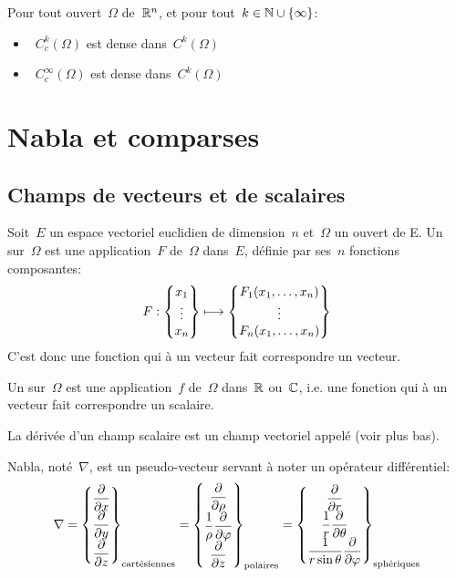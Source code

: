 Pour tout ouvert~$\Omega$ de~$\mathbb R^n$, et pour tout~$k\in\mathbb N\cup\{\infty\}$:
\begin{itemize}
  \item~$C_c^k(\Omega)$ est dense dans~$C^k(\Omega)$
  \item~$C_c^\infty(\Omega)$ est dense dans~$C^k(\Omega)$
\end{itemize}

\medskip
\section{Nabla et comparses}

\subsection{Champs de vecteurs et de scalaires}

\begin{definition}
Soit~$E$ un espace vectoriel euclidien de dimension~$n$ et~$\Omega$ un ouvert de E.
Un  sur~$\Omega$ est une application~$F$ de~$\Omega$ dans~$E$, définie par ses~$n$ fonctions composantes:
\begin{equation}
  F: \VV*{x_1\\\vdots\\x_n} \longmapsto \VV*{F_1(x_1,\dots,x_n)\\ \vdots\\ F_n(x_1,\dots,x_n)}
\end{equation}
C'est donc une fonction qui à un vecteur fait correspondre un vecteur.
\end{definition}

\begin{definition}
Un  sur~$\Omega$ est une application~$f$ de~$\Omega$ dans~$\mathbb R$ ou~$\mathbb C$, i.e. une fonction qui à un vecteur fait correspondre un scalaire.
\end{definition}
La dérivée d'un champ scalaire est un champ vectoriel appelé  (voir plus bas).

\medskip
{} Nabla, noté~$\nabla$, est un pseudo-vecteur  servant à noter un opérateur différentiel:
\begin{equation}
\nabla = \VV*{{\dfrac\partial{\partial x}}\\ \dfrac\partial{\partial y}\\ \dfrac\partial{\partial z}}_{\text{cartésiennes}}
= \VV*{\dfrac\partial{\partial \rho}\\ \dfrac1\rho \dfrac\partial{\partial \varphi}\\ \dfrac\partial{\partial z}}_{\text{polaires}}
= \VV*{\dfrac\partial{\partial r}\\ \dfrac1r \dfrac\partial{\partial \theta}\\\dfrac1{r\sin\theta} \dfrac\partial{\partial \varphi}}_{\text{sphériques}}
\end{equation}

